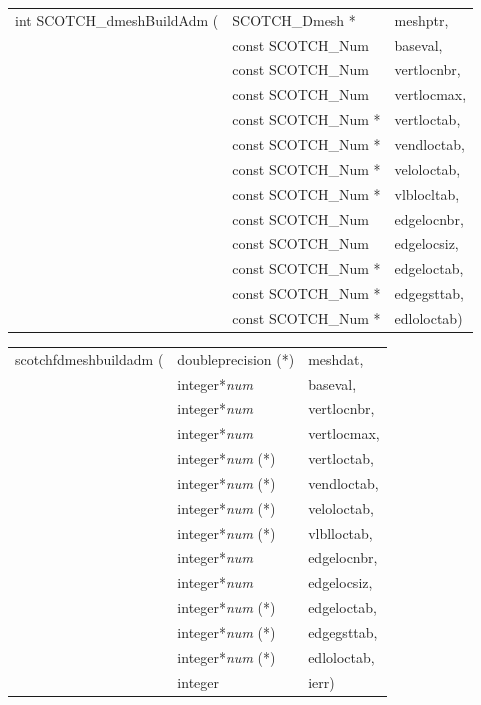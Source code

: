 \begin{itemize}
\progsyn

{\tt\begin{tabular}{l@{}ll}
int SCOTCH\_dmeshBuildAdm ( & SCOTCH\_Dmesh *     & meshptr,    \\
                            & const SCOTCH\_Num   & baseval,    \\
                            & const SCOTCH\_Num   & vertlocnbr, \\
                            & const SCOTCH\_Num   & vertlocmax, \\
                            & const SCOTCH\_Num * & vertloctab, \\
                            & const SCOTCH\_Num * & vendloctab, \\
                            & const SCOTCH\_Num * & veloloctab, \\
                            & const SCOTCH\_Num * & vlblocltab, \\
                            & const SCOTCH\_Num   & edgelocnbr, \\
                            & const SCOTCH\_Num   & edgelocsiz, \\
                            & const SCOTCH\_Num * & edgeloctab, \\
                            & const SCOTCH\_Num * & edgegsttab, \\
                            & const SCOTCH\_Num * & edloloctab)
\end{tabular}}

{\tt\begin{tabular}{l@{}ll}
scotchfdmeshbuildadm ( & doubleprecision (*)   & meshdat,    \\
                       & integer*{\it num}     & baseval,    \\
                       & integer*{\it num}     & vertlocnbr, \\
                       & integer*{\it num}     & vertlocmax, \\
                       & integer*{\it num} (*) & vertloctab, \\
                       & integer*{\it num} (*) & vendloctab, \\
                       & integer*{\it num} (*) & veloloctab, \\
                       & integer*{\it num} (*) & vlblloctab, \\
                       & integer*{\it num}     & edgelocnbr, \\
                       & integer*{\it num}     & edgelocsiz, \\
                       & integer*{\it num} (*) & edgeloctab, \\
                       & integer*{\it num} (*) & edgegsttab, \\
                       & integer*{\it num} (*) & edloloctab, \\
                       & integer               & ierr)
\end{tabular}}


\end{itemize}

